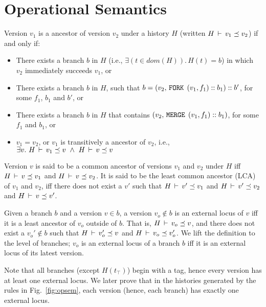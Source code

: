 \section{Operational Semantics}



\begin{definition} 
Version $v_1$ is a ancestor of version $v_2$ under a history
$H$ (written $H\,\vdash\,v_1 \preceq v_2$) if and only if:
\begin{itemize}
  \item There exists a branch $b$ in $H$ (i.e., $\exists(t\in
  dom(H)).\,H(t) = b$) in which $v_2$ immediately succeeds
  $v_1$, or
  \item There exists a branch $b$ in $H$, such that $b = (v_2, 
  \,{\tt FORK}\,\; (v_1,f_1)::b_1)::b'$, for some $f_1$, $b_1$ and $b'$, or
  \item There exists a branch $b$ in $H$ that contains
  $(v_2, \,{\tt MERGE}\,\;(v_1,f_1)::b_1)$, for some $f_1$ and $b_1$, or
  \item $v_1 = v_2$, or $v_1$ is transitively a ancestor of
  $v_2$, i.e., $\exists v.~ H\,\vdash\,v_1 \preceq v ~\wedge~
  H\,\vdash\,v \preceq v$ 
\end{itemize}
\end{definition}

\begin{definition} 
Version $v$ is said to be a common ancestor of versions $v_1$
and $v_2$ under $H$ iff $H\,\vdash\,v \preceq v_1$ and $H\,\vdash\,v
\preceq v_2$. It is said to be the least common ancestor
(LCA) of $v_1$ and $v_2$, iff there does not exist a $v'$ such that
$H\,\vdash\,v' \preceq v_1$ and $H\,\vdash\,v' \preceq v_2$ and
$H\,\vdash\,v \preceq v'$.
\end{definition}

\begin{definition} 
Given a branch $b$ and a version $v\in b$, a version $v_o \not\in b$
is an external locus of $v$ iff it is a least ancestor of $v_o$
outside of $b$. That is, $H\,\vdash\,v_o \preceq v$, and there does
not exist a $v_o' \not\in b$ such that $H\,\vdash\,v_o' \preceq v$ and
$H\,\vdash\,v_o \preceq v_o'$. We lift the definition to the level of
branches; $v_o$ is an external locus of a branch $b$ iff it is an
external locus of its latest version.
\end{definition}

Note that all branches (except $H(t_{\top})$) begin with a 
tag, hence every version has at least one external locus. We later
prove that in the histories generated by the rules in
Fig.~\ref{fig:opsem}, each version (hence, each branch) has exactly
one external locus.

